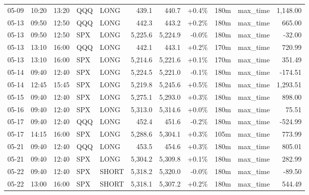 \documentclass[11pt,a4paper,twoside]{article}
\begin{document}
\begin{center}
\begin{longtable}{>{\color{txtmain}}l l l l l r r r r >{\color{txtmain}}l r}
05-09 & 10:20 & 13:20 & QQQ & LONG & 439.1 & 440.7 & \textcolor{wingreen}{+0.4\%} & 180m & max\_time & \textcolor{wingreen}{1,148.00} \\
05-13 & 09:50 & 12:50 & QQQ & LONG & 442.3 & 443.2 & \textcolor{wingreen}{+0.2\%} & 180m & max\_time & \textcolor{wingreen}{665.00} \\
05-13 & 09:50 & 12:50 & SPX & LONG & 5,225.6 & 5,224.9 & \textcolor{lossred}{-0.0\%} & 180m & max\_time & \textcolor{lossred}{-32.00} \\
05-13 & 13:10 & 16:00 & QQQ & LONG & 442.1 & 443.1 & \textcolor{wingreen}{+0.2\%} & 170m & max\_time & \textcolor{wingreen}{720.99} \\
05-13 & 13:10 & 16:00 & SPX & LONG & 5,214.6 & 5,221.6 & \textcolor{wingreen}{+0.1\%} & 170m & max\_time & \textcolor{wingreen}{351.49} \\
05-14 & 09:40 & 12:40 & SPX & LONG & 5,224.5 & 5,221.0 & \textcolor{lossred}{-0.1\%} & 180m & max\_time & \textcolor{lossred}{-174.51} \\
05-14 & 12:45 & 15:45 & SPX & LONG & 5,219.8 & 5,245.6 & \textcolor{wingreen}{+0.5\%} & 180m & max\_time & \textcolor{wingreen}{1,293.51} \\
05-15 & 09:40 & 12:40 & SPX & LONG & 5,275.1 & 5,293.0 & \textcolor{wingreen}{+0.3\%} & 180m & max\_time & \textcolor{wingreen}{898.00} \\
05-16 & 09:40 & 12:40 & SPX & LONG & 5,313.0 & 5,314.6 & \textcolor{wingreen}{+0.0\%} & 180m & max\_time & \textcolor{wingreen}{75.51} \\
05-17 & 09:40 & 12:40 & QQQ & LONG & 452.4 & 451.6 & \textcolor{lossred}{-0.2\%} & 180m & max\_time & \textcolor{lossred}{-524.99} \\
05-17 & 14:15 & 16:00 & SPX & LONG & 5,288.6 & 5,304.1 & \textcolor{wingreen}{+0.3\%} & 105m & max\_time & \textcolor{wingreen}{773.99} \\
05-21 & 09:40 & 12:40 & QQQ & LONG & 453.5 & 454.6 & \textcolor{wingreen}{+0.3\%} & 180m & max\_time & \textcolor{wingreen}{805.01} \\
05-21 & 09:40 & 12:40 & SPX & LONG & 5,304.2 & 5,309.8 & \textcolor{wingreen}{+0.1\%} & 180m & max\_time & \textcolor{wingreen}{282.99} \\
05-22 & 09:40 & 12:40 & SPX & SHORT & 5,318.2 & 5,320.0 & \textcolor{lossred}{-0.0\%} & 180m & max\_time & \textcolor{lossred}{-89.50} \\
05-22 & 13:00 & 16:00 & SPX & SHORT & 5,318.1 & 5,307.2 & \textcolor{wingreen}{+0.2\%} & 180m & max\_time & \textcolor{wingreen}{544.49} \\

\end{longtable}
\end{center}
\end{document}
